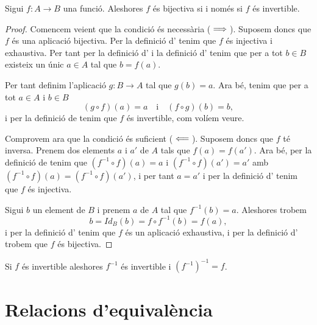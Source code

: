 \documentclass[../Apunts.tex]{subfiles}
\begin{document}
	\begin{theorem}
		\label{thm:bijectiva iff invertible}
		Sigui \(f\colon A\rightarrow B\) una funció. Aleshores \(f\) és bijectiva si i només si \(f\) és invertible.
		\begin{proof}
			Comencem veient que la condició és necessària (\(\implies\)). Suposem doncs que \(f\) és una aplicació bijectiva. Per la definició d' tenim que \(f\) és injectiva i exhaustiva. Per tant per la definició d' i la definició d' tenim que per a tot \(b\in B\) existeix un únic \(a\in A\) tal que \(b=f(a)\).
			
			Per tant definim l'aplicació \(g\colon B\rightarrow A\) tal que \(g(b)=a\). Ara bé, tenim que per a tot \(a\in A\) i \(b\in B\)
			\[(g\circ f)(a)=a\quad\text{i}\quad(f\circ g)(b)=b,\]
			i per la definició de  tenim que \(f\) és invertible, com volíem veure.
			
			Comprovem ara que la condició és suficient (\(\impliedby\)). Suposem doncs que \(f\) té inversa. Prenem dos elements \(a\) i \(a'\) de \(A\) tals que \(f(a)=f(a')\). Ara bé, per la definició de  tenim que \((f^{-1}\circ f)(a)=a\) i \((f^{-1}\circ f)(a')=a'\) amb \((f^{-1}\circ f)(a)=(f^{-1}\circ f)(a')\), i per tant \(a=a'\) i per la definició d' tenim que \(f\) és injectiva.
			
			Sigui \(b\) un element de \(B\) i prenem \(a\) de \(A\) tal que \(f^{-1}(b)=a\). Aleshores trobem
			\[b=Id_{B}(b)=f\circ f^{-1}(b)=f(a),\]
			i per la definició d' tenim que \(f\) és un aplicació exhaustiva, i per la definició d' trobem que \(f\) és bijectiva.
		\end{proof}
	\end{theorem}
	\begin{corollary}
		\label{cor:la inversa d'una aplicació invertible és invertible}
		Si \(f\) és invertible aleshores \(f^{-1}\) és invertible i \(\left(f^{-1}\right)^{-1}=f\).
	\end{corollary}
	\section{Relacions d'equivalència}
\end{document}
